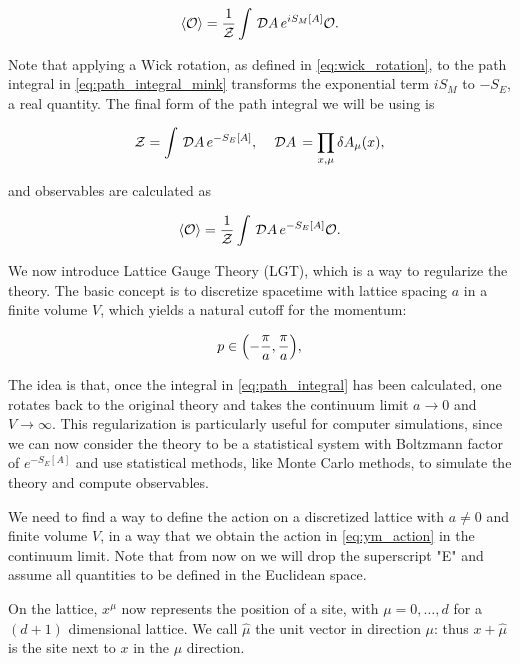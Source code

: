 \documentclass[reqno,12pt]{article}
\numberwithin{equation}{section}
\newcommand{\D}[1]{\,\mathcal{D}#1\,}
\newcommand{\Z}{\mathcal{Z}}
\begin{document}
\begin{equation}
	\expval{\mathcal{O}} = \frac{1}{\Z} \int \D{A} e^{iS_M[A]} \mathcal{O}.
\end{equation}

Note that applying a Wick rotation, as defined in \eqref{eq:wick_rotation}, to
the path integral in \eqref{eq:path_integral_mink} transforms the exponential term $iS_M$ to $-S_E$,
a real quantity. The final form of the path integral we will be using is 

\begin{equation} \label{eq:path_integral}
	\Z = \int \D{A} e^{-S_E[A]} \qc \D{A} = \prod_{x, \mu} \delta A_\mu(x),
\end{equation}

and observables are calculated as

\begin{equation} \label{eq:obs_expval}
	\expval{\mathcal{O}} = \frac{1}{\Z} \int \D{A} e^{-S_E[A]} \mathcal{O}.
\end{equation}

We now introduce Lattice Gauge Theory (LGT), which is a way to regularize the theory. The basic concept
is to discretize spacetime with lattice spacing $a$ in a finite volume $V$, which yields a natural cutoff for the momentum:

\begin{equation}
	p \in \qty(-\frac{\pi}{a}, \frac{\pi}{a}),
\end{equation}

The idea is that, once the integral in \eqref{eq:path_integral} has been calculated, one rotates back to the original
theory and takes the continuum limit $a \rightarrow 0$ and $V \rightarrow \infty$. This regularization is particularly useful
for computer simulations, since we can now consider the theory to be a statistical system with Boltzmann factor of $e^{-S_E[A]}$
and use statistical methods, like Monte Carlo methods, to simulate the theory and compute observables. 

We need to find a way to define the action on a discretized lattice with $a \ne 0$ and finite volume $V$, 
in a way that we obtain the action in \eqref{eq:ym_action} in the continuum limit. Note that from now on we will drop the
superscript "E" and assume all quantities to be defined in the Euclidean space. 

On the lattice, $x^\mu$ now represents the position of a site, with $\mu = 0, \dots, d$ for a $(d+1)$ dimensional lattice.
We call $\hat{\mu}$ the unit vector in direction $\mu$: thus $x + \hat{\mu}$ is the site next to $x$ in the $\mu$ direction.  
\end{document}
